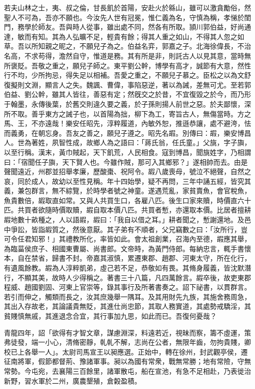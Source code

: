 \begin{pinyinscope}
若夫山林之士，夷、叔之倫，甘長飢於首陽，安赴火於緜山，雖可以激貪勵俗，然聖人不可為，吾亦不願也。今汝先人世有冠冕，惟仁義為名，守慎為稱，孝悌於閨門，務學於師友。吾與時人從事，雖出處不同，然各有所取。頴川郭伯益，好尚通達，敏而有知。其為人弘曠不足，輕貴有餘；得其人重之如山，不得其人忽之如草。吾以所知親之昵之，不願兒子為之。伯益名弈，郭嘉之子。北海徐偉長，不治名高，不求苟得，澹然自守，惟道是務。其有所是非，則託古人以見其意，當時無所褒貶。吾敬之重之，願兒子師之。東平劉公幹，博學有高才，誠節有大意，然性行不均，少所拘忌，得失足以相補。吾愛之重之，不願兒子慕之。臣松之以為文舒復擬則文淵，顯言人之失。魏諷、曹偉，事陷惡逆，著以為誡，差無可尤。至若郭伯益、劉公幹，雖其人皆往，善惡有定；然旣交之於昔，不宜復毀之於今，而乃形于翰墨，永傳後葉，於舊交則違久要之義，於子孫則揚人前世之惡。於夫鄙懷，深所不取。善乎東方之誡子也，以首陽為拙，柳下為工，寄旨古人，無傷當時。方之馬、王，不亦遠哉！樂安任昭先，淳粹履道，內敏外恕，推遜恭讓，處不避洿，怯而義勇，在朝忘身。吾友之善之，願兒子遵之。昭先名嘏。別傳曰：嘏，樂安博昌人。世為著姓，夙智性成，故鄉人為之語曰：「蔣氏翁，任氏童。」父旐，字子旟，以至行稱。漢末，黃巾賊起，天下飢荒，人民相食。寇到博昌，聞旐姓字，乃相謂曰：「宿聞任子旟，天下賢人也。今雖作賊，那可入其鄉邪？」遂相帥而去。由是聲聞遠近，州郡並招舉孝廉，歷酸棗、祝阿令。嘏八歲喪母，號泣不絕聲，自然之哀，同於成人，故幼以至性見稱。年十四始學，疑不再問，三年中誦五經，皆究其義，兼包群言，無不綜覽，於時學者號之神童。遂遇荒亂，家貧賣魚，會官稅魚，魚貴數倍，嘏取直如常。又與人共買生口，各雇八匹。後生口家來贖，時價直六十匹。共買者欲隨時價取贖，嘏自取本價八匹。共買者慙，亦還取本價。比居者擅耕嘏地數十畝種之，人以語嘏，嘏曰：「我自以借之耳。」耕者聞之，慙謝還地。及邑中爭訟，皆詣嘏質之，然後意厭。其子弟有不順者，父兄竊數之曰：「汝所行，豈可令任君知邪！」其禮教所化，率皆如此。會太祖創業，召海內至德，嘏應其舉，為臨菑侯庶子、相國東曹屬、尚書郎。文帝時，為黃門侍郎。每納忠言，輒手書懷本，自在禁省，歸書不封。帝嘉其淑慎，累遷東郡、趙郡、河東太守，所在化行，有遺風餘教。嘏為人淳粹凱弟，虛己若不足，恭敬如有畏。其脩身履義，皆沈默潛行，不顯其美，故時人少得稱之。著書三十八篇，凡四萬餘言。嘏卒後，故吏東郡程威、趙國劉固、河東上官崇等，錄其事行及所著書奏之。詔下祕書，以貫群言。若引而伸之，觸類而長之，汝其庶幾舉一隅耳。及其用財先九族，其施舍務周急，其出入存故老，其論議貴無貶，其進仕尚忠節，其取人務實道，其處勢戒驕淫，其貧賤慎無戚，其進退念合宜，其行事加九思，如此而已。吾復何憂哉？

青龍四年，詔「欲得有才智文章，謀慮淵深，料遠若近，視昧而察，籌不虛運，策弗徒發，端一小心，清脩密靜，乹乹不解，志尚在公者，無限年齒，勿拘貴賤，卿校已上各舉一人」。太尉司馬宣王以昶應選。正始中，轉在徐州，封武觀亭侯，遷征南將軍，假節都督荊、豫諸軍事。昶以為國有常衆，戰無常勝；地有常險，守無常勢。今屯宛，去襄陽三百餘里，諸軍散屯，船在宣池，有急不足相赴，乃表徙治新野，習水軍於二州，廣農墾殖，倉糓盈積。


\end{pinyinscope}
